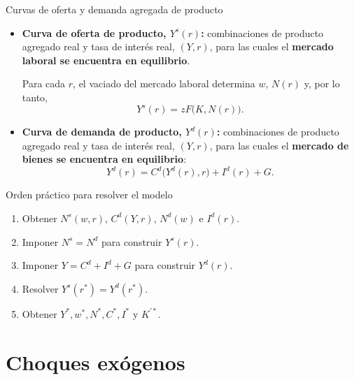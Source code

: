 \documentclass[aspectratio=169,11pt]{beamer}
\begin{document}
\begin{frame}{Curvas de oferta y demanda agregada de producto}
  \begin{itemize}
    \item \textbf{Curva de oferta de producto, \(Y^s(r)\):} combinaciones de producto agregado real y tasa de interés real, $(Y,r)$, para las cuales el \textbf{mercado laboral se encuentra en equilibrio}.
    
    Para cada \(r\), el vaciado del mercado laboral determina \(w\), \(N(r)\) y, por lo tanto,
    \[
      Y^s(r)=zF\bigl(K,N(r)\bigr).
    \]
    \item \textbf{Curva de demanda de producto, \(Y^d(r)\):} combinaciones de producto agregado real y tasa de interés real, $(Y,r)$, para las cuales el \textbf{mercado de bienes se encuentra en equilibrio}:
    \[
      Y^d(r)
      =
      C^d\bigl(Y^d(r),r\bigr)+I^d(r)+G.
    \]
  \end{itemize}
\end{frame}



\begin{frame}{Orden práctico para resolver el modelo}
  \begin{enumerate}
    \setlength{\itemsep}{0.62em}
    \item Obtener \(N^s(w,r)\), \(C^d(Y,r)\), \(N^d(w)\) e \(I^d(r)\).
    \item Imponer \(N^s=N^d\) para construir \(Y^s(r)\).
    \item Imponer \(Y=C^d+I^d+G\) para construir \(Y^d(r)\).
    \item Resolver \(Y^s(r^*)=Y^d(r^*)\).
    \item Obtener \(Y^*,w^*,N^*,C^*,I^*\) y \(K^{\prime *}\).
  \end{enumerate}
\end{frame}



\section{Choques exógenos}
\end{document}
